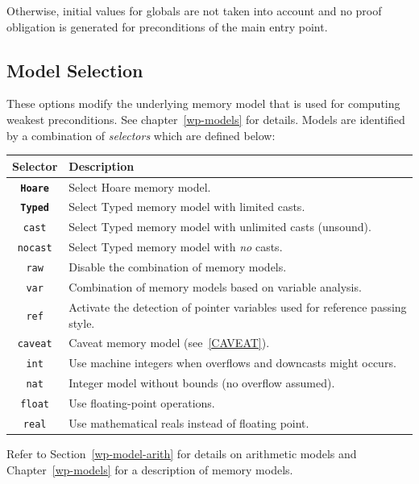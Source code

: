 Otherwise, initial values for globals are not taken into account and
no proof obligation is generated for preconditions of the main entry
point.

\subsection{Model Selection}
These options modify the underlying memory model that is used for
computing weakest preconditions. See chapter~\ref{wp-models} for
details. Models are identified by a combination of \emph{selectors}
which are defined below:
\begin{center}
  \begin{tabular}{cl}
    Selector & Description \\
    \hline
    \texttt{\bf Hoare} & Select Hoare memory model. \\
    \texttt{\bf Typed} & Select Typed memory model with limited casts.\\
    \texttt{cast}  & Select Typed memory model with unlimited casts (unsound). \\
    \texttt{nocast} & Select Typed memory model with \emph{no} casts. \\
    \hline
    \texttt{raw} & Disable the combination of memory models. \\
    \texttt{var} & Combination of memory models based on variable analysis. \\
    \texttt{ref} & Activate the detection of pointer variables used for reference passing style. \\
    \texttt{caveat} & Caveat memory model (see~\ref{CAVEAT}). \\
    \hline
    \texttt{int} & Use machine integers when overflows and downcasts might occurs. \\
    \texttt{nat} & Integer model without bounds (no overflow assumed). \\
    \hline
    \texttt{float} & Use floating-point operations. \\
    \texttt{real} & Use mathematical reals instead of floating point. \\
    \hline
  \end{tabular}
\end{center}

Refer to Section~\ref{wp-model-arith} for details on arithmetic models and
Chapter~\ref{wp-models} for a description of memory models.

